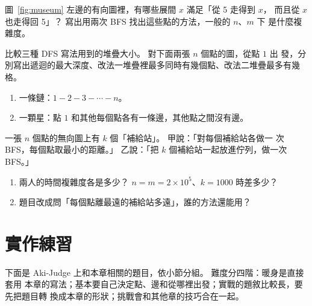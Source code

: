 \begin{drills}[label=drills:ch11]
\item 圖~\ref{fig:museum} 左邊的有向圖裡，有哪些展間 $x$ 滿足「從 5 走得到 $x$，
而且從 $x$ 也走得回 5」？ 寫出用兩次 BFS 找出這些點的方法，一般的 $n$、$m$ 下
是什麼複雜度。

\item 比較三種 DFS 寫法用到的堆疊大小。 對下面兩張 $n$ 個點的圖，從點 $1$ 出
發，分別寫出遞迴的最大深度、改法一堆疊裡最多同時有幾個點、改法二堆疊最多有幾
格。
\begin{enumerate}
\item 一條鏈：$1 - 2 - 3 - \cdots - n$。
\item 一顆星：點 $1$ 和其他每個點各有一條邊，其他點之間沒有邊。
\end{enumerate}

\item 一張 $n$ 個點的無向圖上有 $k$ 個「補給站」。 甲說：「對每個補給站各做一
次 BFS，每個點取最小的距離。」 乙說：「把 $k$ 個補給站一起放進佇列，做一次
BFS。」
\begin{enumerate}
\item 兩人的時間複雜度各是多少？ $n = m = 2 \times 10^5$、$k = 1000$ 時差多少？
\item 題目改成問「每個點離最遠的補給站多遠」，誰的方法還能用？
\end{enumerate}
\end{drills}

\section{實作練習}
\label{sec:ch11-practice}

下面是 Aki-Judge 上和本章相關的題目，依小節分組。 難度分四階：暖身是直接套用
本章的寫法；基本要自己決定點、邊和從哪裡出發；實戰的題敘比較長，要先把題目轉
換成本章的形狀；挑戰會和其他章的技巧合在一起。

